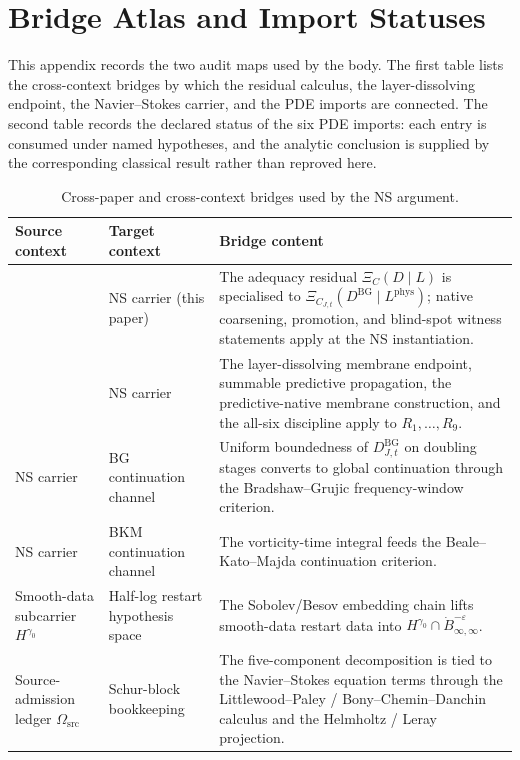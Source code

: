 \documentclass[11pt]{article}
\newcommand{\eps}{\varepsilon}
\newcommand{\DBG}{D^{\mathrm{BG}}}
\newcommand{\Lphys}{L^{\mathrm{phys}}}
\newcommand{\Omsrc}{\Omega_{\mathrm{src}}}
\theoremstyle{definition}
\begin{document}
 \section{Bridge Atlas and Import Statuses}
\label{app:bridge-atlas}

This appendix records the two audit maps used by the body.  The first
table lists the cross-context bridges by which the residual calculus,
the layer-dissolving endpoint, the Navier--Stokes carrier, and the PDE
imports are connected.  The second table records the declared status of
the six PDE imports: each entry is consumed under named hypotheses, and
the analytic conclusion is supplied by the corresponding classical
result rather than reproved here.

\begin{table}[ht]
\centering
\footnotesize
\begin{tabularx}{\textwidth}{@{}>{\raggedright\arraybackslash}p{}
                                >{\raggedright\arraybackslash}p{}
                                >{\raggedright\arraybackslash}X@{}}
\toprule
Source context & Target context & Bridge content \\
\midrule
\citet{Tsiokos2026XiCompanion}
  & NS carrier (this paper)
  & The adequacy residual \(\Xi_C(D \mid L)\) is specialised to
    \(\Xi_{C_{J,t}}(\DBG \mid \Lphys)\); native coarsening,
    promotion, and blind-spot witness statements apply at the NS
    instantiation. \\
\citet{Tsiokos2026NeedleKiller}
  & NS carrier
  & The layer-dissolving membrane endpoint, summable predictive
    propagation, the predictive-native membrane construction, and the
    all-six discipline apply to \(R_1,\ldots,R_9\). \\
NS carrier
  & BG continuation channel
  & Uniform boundedness of \(\DBG_{J,t}\) on doubling stages converts
    to global continuation through the Bradshaw--Grujic
    frequency-window criterion. \\
NS carrier
  & BKM continuation channel
  & The vorticity-time integral feeds the Beale--Kato--Majda
    continuation criterion. \\
Smooth-data subcarrier \(H^{\gamma_0}\)
  & Half-log restart hypothesis space
  & The Sobolev/Besov embedding chain lifts smooth-data restart data
    into \(H^{\gamma_0} \cap \dot B^{-\eps}_{\infty,\infty}\). \\
Source-admission ledger \(\Omsrc\)
  & Schur-block bookkeeping
  & The five-component decomposition is tied to the Navier--Stokes
    equation terms through the Littlewood--Paley /
    Bony--Chemin--Danchin calculus and the Helmholtz / Leray
    projection. \\
\bottomrule
\end{tabularx}
\caption{Cross-paper and cross-context bridges used by the NS argument.}
\label{tab:ns-bridge-atlas}
\end{table}
\end{document}
